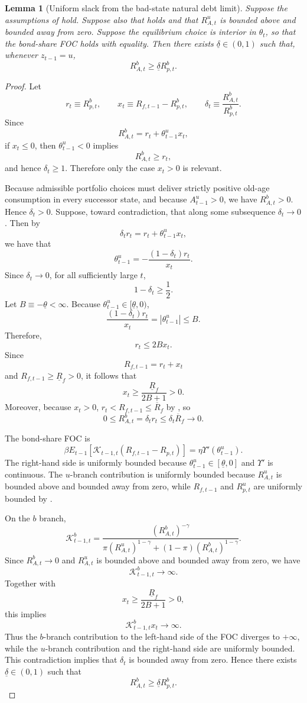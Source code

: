 \documentclass[12pt]{article}
\theoremstyle{plain}
\newtheorem{lem}{Lemma}
\begin{document}
\begin{lem}[Uniform slack from the bad-state natural debt limit]
\label{lem_uniform_natural_debt_slack}
Suppose the assumptions of
hold. Suppose also that  holds and that
$R^u_{A,t}$ is bounded above and bounded away from zero. Suppose the equilibrium
choice is interior in $\theta_t$, so that the bond-share FOC holds with equality.
Then there exists
$\underline\delta\in(0,1)$ such that, whenever $z_{t-1}=u$,
$$
R^b_{A,t}\ge \underline\delta R^b_{p,t}.
$$
\end{lem}
\begin{proof}
Let
\[
r_t\equiv R^b_{p,t},\qquad
x_t\equiv R_{f,t-1}-R^b_{p,t},
\qquad
\delta_t\equiv \frac{R^b_{A,t}}{R^b_{p,t}}.
\]
Since
\[
R^b_{A,t}
=
r_t+\theta^u_{t-1}x_t,
\]
if $x_t\le0$, then $\theta^u_{t-1}<0$ implies
\[
R^b_{A,t}\ge r_t,
\]
and hence $\delta_t\ge1$. Therefore only the case $x_t>0$ is relevant.

Because admissible portfolio choices must deliver strictly positive old-age
consumption in every successor state, and because \(A_{t-1}^u>0\), we have
\(R^b_{A,t}>0\). Hence \(\delta_t>0\). Suppose, toward contradiction, that along some subsequence $\delta_t\to0$.
Then by
\[
\delta_t r_t
=
r_t+\theta^u_{t-1}x_t,
\]
we have that
\[
\theta^u_{t-1}
=
-\frac{(1-\delta_t)r_t}{x_t}.
\]
Since $\delta_t\to0$, for all sufficiently large $t$,
\[
1-\delta_t\ge \frac12.
\]
Let $B\equiv-\underline\theta<\infty$. Because
$\theta^u_{t-1}\in[\underline\theta,0)$,
\[
\frac{(1-\delta_t)r_t}{x_t}
=
|\theta^u_{t-1}|
\le B.
\]
Therefore,
\[
r_t\le 2B x_t.
\]
Since
\[
R_{f,t-1}=r_t+x_t
\]
and $R_{f,t-1}\ge \underline R_f>0$, it follows that
\[
x_t
\ge
\frac{\underline R_f}{2B+1}
>0.
\]
Moreover, because $x_t>0$, $r_t<R_{f,t-1}\le \overline R_f$ by
, so
\[
0\le R^b_{A,t}
=
\delta_t r_t
\le
\delta_t \overline R_f
\to0.
\]

The bond-share FOC is
\[
\beta
E_{t-1}\left[
\mathcal K_{t-1,t}(R_{f,t-1}-R_{p,t})
\right]
=
\eta\Upsilon'(\theta^u_{t-1}).
\]
The right-hand side is uniformly bounded because
$\theta^u_{t-1}\in[\underline\theta,0]$ and $\Upsilon'$ is continuous.
The $u$-branch contribution is uniformly bounded because $R^u_{A,t}$ is
bounded above and bounded away from zero, while $R_{f,t-1}$ and $R^u_{p,t}$
are uniformly bounded by .

On the $b$ branch,
\[
\mathcal K^b_{t-1,t}
=
\frac{(R^b_{A,t})^{-\gamma}}
{\pi (R^u_{A,t})^{1-\gamma}
+(1-\pi)(R^b_{A,t})^{1-\gamma}}.
\]
Since $R^b_{A,t}\to0$ and $R^u_{A,t}$ is bounded above and bounded away from
zero, we have
\[
\mathcal K^b_{t-1,t}\to\infty.
\]
Together with
\[
x_t\ge \frac{\underline R_f}{2B+1}>0,
\]
this implies
\[
\mathcal K^b_{t-1,t}x_t\to\infty.
\]
Thus the $b$-branch contribution to the left-hand side of the FOC diverges to
$+\infty$, while the $u$-branch contribution and the right-hand side are uniformly
bounded. This contradiction implies that $\delta_t$ is bounded away from zero.
Hence there exists $\underline\delta\in(0,1)$ such that
\[
R^b_{A,t}\ge \underline\delta R^b_{p,t}.
\]
\end{proof}
\end{document}
